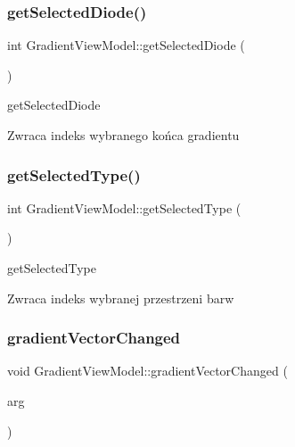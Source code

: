 \subsubsection{\texorpdfstring{get\+Selected\+Diode()}{getSelectedDiode()}}
{\footnotesize\ttfamily int Gradient\+View\+Model\+::get\+Selected\+Diode (\begin{DoxyParamCaption}{ }\end{DoxyParamCaption})}



get\+Selected\+Diode 

\begin{DoxyReturn}{Zwraca}
indeks wybranego końca gradientu 
\end{DoxyReturn}
\mbox{\label{class_gradient_view_model_a44e6045ecb0d0ee9a9ab775e97ddf33c}} 
\subsubsection{\texorpdfstring{get\+Selected\+Type()}{getSelectedType()}}
{\footnotesize\ttfamily int Gradient\+View\+Model\+::get\+Selected\+Type (\begin{DoxyParamCaption}{ }\end{DoxyParamCaption})}



get\+Selected\+Type 

\begin{DoxyReturn}{Zwraca}
indeks wybranej przestrzeni barw 
\end{DoxyReturn}
\mbox{\label{class_gradient_view_model_a5f33840baf0a02fab681992c3a9fbb29}} 
\subsubsection{\texorpdfstring{gradient\+Vector\+Changed}{gradientVectorChanged}}
{\footnotesize\ttfamily void Gradient\+View\+Model\+::gradient\+Vector\+Changed (\begin{DoxyParamCaption}\item[{Q\+Vector$<$ Q\+String $>$}]{arg }\end{DoxyParamCaption})\hspace{0.3cm}{\ttfamily [signal]}}



